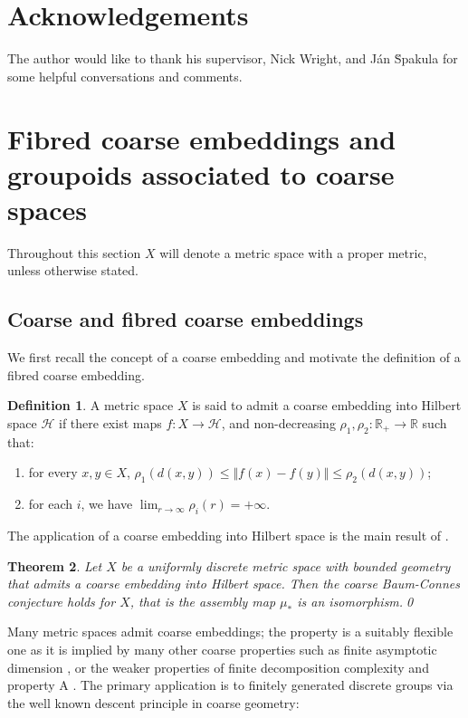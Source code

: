 \documentclass[preprint]{elsarticle}
\theoremstyle{plain}
\newtheorem{theorem}{Theorem}%
\theoremstyle{definition}%
\newtheorem{definition}[theorem]{Definition}%
\theoremstyle{remark}%
\begin{document}
\section*{Acknowledgements}
The author would like to thank his supervisor, Nick Wright, and J\'{a}n \u{S}pakula for some helpful conversations and comments.

\section{Fibred coarse embeddings and groupoids associated to coarse spaces}\label{sect:coarse}
Throughout this section $X$ will denote a metric space with a proper metric, unless otherwise stated.

\subsection{Coarse and fibred coarse embeddings}
We first recall the concept of a coarse embedding and motivate the definition of a fibred coarse embedding.

\begin{definition}\label{def:FCE}
A metric space $X$ is said to admit a coarse embedding into Hilbert space $\mathcal{H}$ if there exist maps $f:X \rightarrow \mathcal{H}$,  and non-decreasing $\rho_{1},\rho_{2}:\mathbb{R}_{+} \rightarrow \mathbb{R}$ such that:
\begin{enumerate}
\item for every $x,y \in X$, $\rho_{1}(d(x,y)) \leq \Vert f(x) - f(y) \Vert \leq \rho_{2}(d(x,y))$;
\item for each $i$, we have $\lim_{r \rightarrow \infty}\rho_{i}(r) = +\infty$.
\end{enumerate}
\end{definition}

The application of a coarse embedding into Hilbert space is the main result of \cite{MR1728880, MR1905840}.

\begin{theorem}
Let $X$ be a uniformly discrete metric space with bounded geometry that admits a coarse embedding into Hilbert space. Then the coarse Baum-Connes conjecture holds for $X$, that is the assembly map $\mu_{*}$ is an isomorphism.\qed
\end{theorem}

Many metric spaces admit coarse embeddings; the property is a suitably flexible one as it is implied by many other coarse properties such as finite asymptotic dimension \cite{MR1739727}, or the weaker properties of finite decomposition complexity \cite{MR2947546} and property A \cite{MR1728880}. The primary application is to finitely generated discrete groups via the well known descent principle in coarse geometry:
\end{document}

